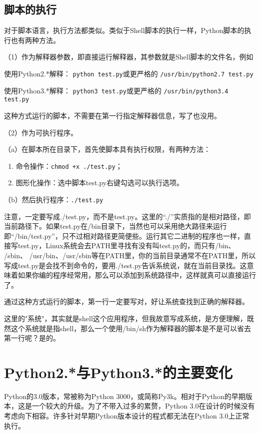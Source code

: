\subsection{脚本的执行}
对于脚本语言，执行方法都类似。类似于Shell脚本的执行一样，Python脚本的执行也有两种方法。

（1）作为解释器参数，即直接运行解释器，其参数就是Shell脚本的文件名，例如

使用Python2.*解释：
\verb|python test.py|\qquad 或更严格的 \qquad \verb|/usr/bin/python2.7 test.py|

使用Python3.*解释：
\verb|python3 test.py|\qquad 或更严格的 \qquad \verb|/usr/bin/python3.4 test.py|

这种方式运行的脚本，不需要在第一行指定解释器信息，写了也没用。

（2）作为可执行程序。

（a）在脚本所在目录下，首先使脚本具有执行权限，有两种方法：
\begin{enumerate}
\item 命令操作：\verb|chmod +x ./test.py|；
\item 图形化操作：选中脚本test.py右键勾选可以执行选项。
\end{enumerate}

（b）然后执行程序：\verb|./test.py|

注意，一定要写成./test.py，而不是test.py。这里的“./”实质指的是相对路径，即当前路径下。如果test.py在/bin目录下，当然也可以采用绝大路径来运行即“/bin/test.py”，只不过相对路径更简便些。运行其它二进制的程序也一样，直接写test.py，Linux系统会去PATH里寻找有没有叫test.py的，而只有/bin、 /sbin、 /usr/bin、/usr/sbin等在PATH里，你的当前目录通常不在PATH里，所以写成test.py是会找不到命令的，要用./test.py告诉系统说，就在当前目录找。这意味着如果你编的程序经常用，那么可以添加到系统路径中，这样就真可以直接运行了。

通过这种方式运行的脚本，第一行一定要写对，好让系统查找到正确的解释器。

这里的"系统"，其实就是shell这个应用程序，但我故意写成系统，是方便理解，既然这个系统就是指shell，那么一个使用/bin/sh作为解释器的脚本是不是可以省去第一行呢？是的。



\section{Python2.*与Python3.*的主要变化}
Python的3​​.0版本，常被称为Python 3000，或简称Py3k。相对于Python的早期版本，这是一个较大的升级。为了不带入过多的累赘，Python 3.0在设计的时候没有考虑向下相容。许多针对早期Python版本设计的程式都无法在Python 3.0上正常执行。


